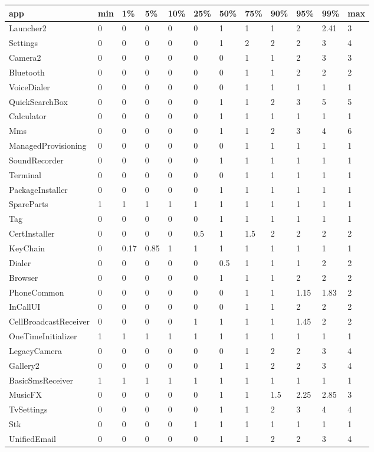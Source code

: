 \documentclass[a4paper]{article}
\begin{document}
\begin{tabular}{|l|l|l|l|l|l|l|l|l|l|l|l|}
\hline
app&min&1\%&5\%&10\%&25\%&50\%&75\%&90\%&95\%&99\%&max\\
\hline
Launcher2&0&0&0&0&0&1&1&1&2&2.41&3\\
\hline
Settings&0&0&0&0&0&1&2&2&2&3&4\\
\hline
Camera2&0&0&0&0&0&0&1&1&2&3&3\\
\hline
Bluetooth&0&0&0&0&0&0&1&1&2&2&2\\
\hline
VoiceDialer&0&0&0&0&0&0&1&1&1&1&1\\
\hline
QuickSearchBox&0&0&0&0&0&1&1&2&3&5&5\\
\hline
Calculator&0&0&0&0&0&1&1&1&1&1&1\\
\hline
Mms&0&0&0&0&0&1&1&2&3&4&6\\
\hline
ManagedProvisioning&0&0&0&0&0&0&1&1&1&1&1\\
\hline
SoundRecorder&0&0&0&0&0&1&1&1&1&1&1\\
\hline
Terminal&0&0&0&0&0&0&1&1&1&1&1\\
\hline
PackageInstaller&0&0&0&0&0&1&1&1&1&1&1\\
\hline
SpareParts&1&1&1&1&1&1&1&1&1&1&1\\
\hline
Tag&0&0&0&0&0&1&1&1&1&1&1\\
\hline
CertInstaller&0&0&0&0&0.5&1&1.5&2&2&2&2\\
\hline
KeyChain&0&0.17&0.85&1&1&1&1&1&1&1&1\\
\hline
Dialer&0&0&0&0&0&0.5&1&1&1&2&2\\
\hline
Browser&0&0&0&0&0&1&1&1&2&2&2\\
\hline
PhoneCommon&0&0&0&0&0&0&1&1&1.15&1.83&2\\
\hline
InCallUI&0&0&0&0&0&0&1&1&2&2&2\\
\hline
CellBroadcastReceiver&0&0&0&0&1&1&1&1&1.45&2&2\\
\hline
OneTimeInitializer&1&1&1&1&1&1&1&1&1&1&1\\
\hline
LegacyCamera&0&0&0&0&0&0&1&2&2&3&4\\
\hline
Gallery2&0&0&0&0&0&1&1&2&2&3&4\\
\hline
BasicSmsReceiver&1&1&1&1&1&1&1&1&1&1&1\\
\hline
MusicFX&0&0&0&0&0&1&1&1.5&2.25&2.85&3\\
\hline
TvSettings&0&0&0&0&0&1&1&2&3&4&4\\
\hline
Stk&0&0&0&0&1&1&1&1&1&1&1\\
\hline
UnifiedEmail&0&0&0&0&0&1&1&2&2&3&4\\

\end{tabular}
\end{document}
